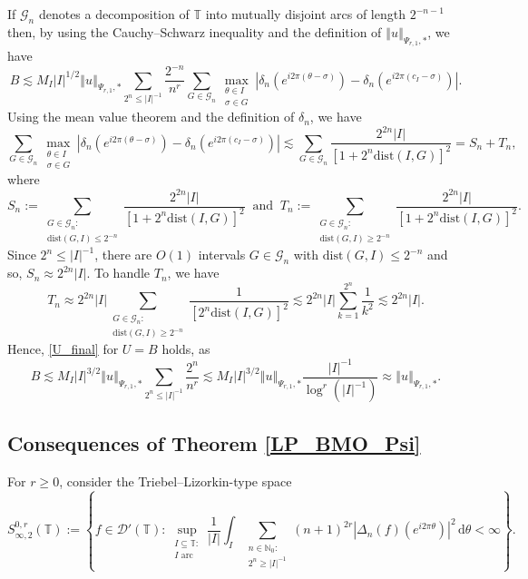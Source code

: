 \documentclass[a4paper, leqno, 10pt]{amsart}
\numberwithin{equation}{section}
\newcommand{\dd}{\mathrm{d}}
\newcommand{\T}{\mathbb{T}}
\newcommand{\norm}[1]{\left\Vert#1\right\Vert}
\newcommand{\abs}[1]{\left|#1\right|}
\newcommand{\N}{\mathbb{N}}
\begin{document}
If $ \mathcal{G}_n $ denotes a decomposition of $\T$ into mutually disjoint arcs of length $2^{-n-1}$ then, by using the Cauchy--Schwarz inequality and the definition of $\norm{u}_{\Psi_{r,1}, \ast}$, we have
\[
B \lesssim  M_I | I |^{1/2} \norm{u}_{\Psi_{r,1}, \ast} \sum_{ 2^n \leq | I |^{-1} }  \frac{2^{-n}}{n^r} \sum_{G \in \mathcal{G}_n} \max_{\substack{ \theta \in I \\ \sigma \in G}} \abs{ \delta_n \left( e^{i 2 \pi (\theta - \sigma ) } \right) - \delta_n \left( e^{i 2 \pi (c_I - \sigma) } \right) } .
\] 
Using the mean value theorem and the definition of $\delta_n$, we have
\[
\sum_{G \in \mathcal{G}_n} \max_{\substack{ \theta \in I \\ \sigma \in G}} \abs{ \delta_n \left( e^{i 2 \pi (\theta - \sigma ) } \right) - \delta_n \left( e^{i 2 \pi (c_I - \sigma) } \right) } \lesssim \sum_{G \in \mathcal{G}_n}    \frac{2^{2n}  | I |}{ \left[ 1 + 2^n \mathrm{dist} (I , G) \right]^2 } = S_n + T_n,
\] 
where
\[
S_n := \sum_{\substack{ G \in \mathcal{G}_n: \\ \mathrm{dist} (G, I) \leq 2^{-n}}}\frac{2^{2n}  | I |}{ \left[ 1 + 2^n \mathrm{dist} (I , G) \right]^2 }      \ \text{ and } \  T_n := \sum_{\substack{G \in \mathcal{G}_n: \\ \mathrm{dist} (G, I) \geq 2^{-n} } }   \frac{2^{2n}  | I |}{ \left[ 1 + 2^n \mathrm{dist} (I , G) \right]^2 }  .
\]
Since $2^n \leq | I |^{-1}$, there are $O(1)$ intervals $G \in \mathcal{G}_n$ with $ \mathrm{dist} (G, I) \leq 2^{-n}$ and so, $ S_n \approx 2^{2n} |I| $. To handle $T_n$, we have 
\[
T_n \approx 2^{2n} |I| \sum_{\substack{G \in \mathcal{G}_n: \\ \mathrm{dist} (G, I) \geq 2^{-n} } }  \frac{1}{  \left[ 2^n \mathrm{dist} (I , G) \right]^2 }  \lesssim 2^{2n} |I| \sum_{k=1}^{2^n} \frac{1}{k^2} \lesssim 2^{2n} |I| .
\]
Hence, \eqref{U_final} for $U=B$ holds, as
\[
B \lesssim M_I | I |^{3/2} \norm{u}_{\Psi_{r,1}, \ast} \sum_{ 2^n \leq | I |^{-1} }  \frac{2^n}{n^r}   \lesssim M_I | I |^{3/2} \norm{u}_{\Psi_{r,1}, \ast}  \frac{ | I |^{-1}}{\log^r ( | I |^{-1})} \approx \norm{u}_{\Psi_{r,1}, \ast}  .
\] 

%
\subsection{Consequences of Theorem \ref{LP_BMO_Psi}}\label{L-P_ineq_duality}
%

For $r \geq 0$, consider the Triebel--Lizorkin-type space 
%
\[
S^{0,r}_{\infty,2} (\T) := %
\left\{ f \in \mathcal{D}' (\T): \sup_{\substack{I \subseteq \T:\\ I \text{ arc }}} \frac{1}{|I|} \int_I \sum_{\substack{ n \in \N_0 : \\ 2^n \geq |I|^{-1} } } \left( n +1 \right)^{2r} |  \Delta_n (f) (e^{i 2 \pi \theta}) |^2 \, \dd \theta  < \infty \right\}. 
\]
\end{document}
